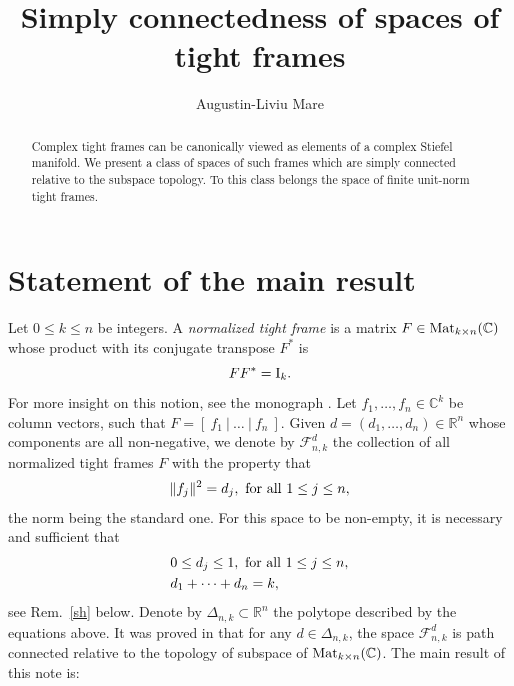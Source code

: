 \documentclass[12pt]{amsart}
\theoremstyle{definition}
\theoremstyle{remark}
\newcommand{\RR}{\mathbb R}
\newcommand{\CC}{\mathbb C}
\begin{document}
\address{Department of Mathematics and Statistics\\ University of Regina\\ Canada}




\title{Simply connectedness of spaces of tight frames}


\author{Augustin-Liviu Mare}


\begin{abstract} Complex tight frames can be canonically viewed as elements of a complex Stiefel manifold. We present a class of spaces of such frames which are simply connected relative to the subspace topology. 
To this class belongs the space of finite unit-norm tight frames.     
\end{abstract}
\maketitle

\section{Statement of the main result}\label{sect1}

Let $0\le k \le n$ be integers. A {\it normalized tight frame} is a matrix $F\in {\rm Mat}_{k\times n}(\CC)$ whose product with its  conjugate transpose  $F^*$ is 
\begin{equation}\label{star}FF^* = {\rm I}_k.\end{equation} For more insight on this notion, see the monograph \cite{Wa}. 
Let $f_1, \ldots, f_n \in \CC^k$ be  column vectors, such that $F=[ \ f_1 \ | \ \ldots \ | \ f_n \ ]$. 
Given $d=(d_1,\ldots, d_n) \in \RR^n$ whose components are all non-negative, we denote by ${\mathcal F}_{n,k}^d$ the collection of all normalized tight frames $F$ with the property that
$$\|f_j\|^2=d_j, \  {\rm for \ all \ } 1 \le j \le n,$$
the norm being the standard one. 
For this space to be non-empty, it is necessary and sufficient that 
\begin{align*}
{}& 0\le d_j \le 1, \ {\rm for \ all \ } 1\le j \le n, \\  
{}& d_1+\cdots + d_n=k,
\end{align*}
see Rem.~\ref{sh} below.
Denote by $\Delta_{n,k}\subset \RR^n$ the polytope described by the equations above. 
It was proved in \cite{NS1} that for any $d \in \Delta_{n,k}$, the space ${\mathcal F}_{n,k}^d$ is path connected 
relative to the topology of subspace of  ${\rm Mat}_{k\times n}(\CC)$. The main result of this note is:
\end{document}

